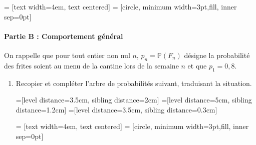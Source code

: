 \documentclass[11pt,fleqn, openany]{book} %
\begin{document}
\begin{exercise}[topic=prob01]
\begin{minipage}{0.4\linewidth}
 = [text width=4em, text centered]
 = [circle, minimum width=3pt,fill, inner sep=0pt]


\begin{center}
\end{center}


\end{minipage}

\newpage

\paragraph{Partie B : Comportement général}

On rappelle que pour tout entier non nul $n$, $p_n=\mathbb{P}(F_n)$ désigne la probabilité des frites soient au menu de la cantine lors de la semaine $n$ et que $p_1=0,8$.

\begin{enumerate}
\item Recopier et compléter l'arbre de probabilités suivant, traduisant la situation.

    
    =[level distance=3.5cm, sibling distance=2cm]
=[level distance=5cm, sibling distance=1.2cm]
=[level distance=3.5cm, sibling distance=0.3cm]

 = [text width=4em, text centered]
 = [circle, minimum width=3pt,fill, inner sep=0pt]



\end{enumerate}
\end{exercise}
\end{document}
